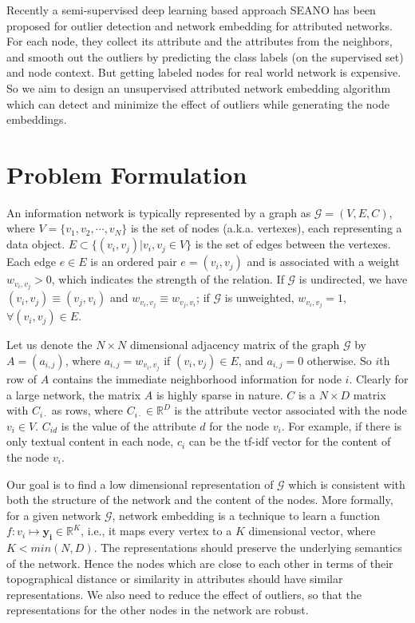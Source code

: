\documentclass[letterpaper]{article} %
\begin{document}
Recently a semi-supervised deep learning based approach SEANO \cite{liang2018semi} has been proposed for outlier detection and network embedding for attributed networks. For each node, they collect its attribute and the attributes from the neighbors, and smooth out the outliers by predicting the class labels (on the supervised set) and node context. But getting labeled nodes for real world network is expensive. So we aim to design an unsupervised attributed network embedding algorithm which can detect and minimize the effect of outliers while generating the node embeddings.  

\section{Problem Formulation} \label{sec:prob}
An information network is typically represented by a graph as $\mathcal{G} = (V, E, C)$, where $V=\{v_1, v_2,\cdots, v_N\}$ is the set of nodes (a.k.a. vertexes), each representing a data object. $E \subset \{(v_i,v_j) | v_i,v_j \in V \}$ is the set of edges between the vertexes. 
Each edge $e \in E$ is an ordered pair $e = (v_i, v_j)$ and is associated with a weight $w_{v_i,v_j} > 0$, which indicates the strength of the relation. If $\mathcal{G}$ is undirected, we have $(v_i, v_j) \equiv (v_j, v_i)$ and $w_{v_i,v_j} \equiv w_{v_j,v_i}$; if $\mathcal{G}$ is unweighted, $w_{v_i,v_j} = 1$, $\forall (v_i,v_j) \in E$.

Let us denote the $N \times N$ dimensional adjacency matrix of the graph $\mathcal{G}$ by $A = (a_{i,j})$, where $a_{i,j}=w_{v_i,v_j}$ if $(v_i,v_j) \in E$, and $a_{i,j}=0$ otherwise. So $i$th row of $A$ contains the immediate neighborhood information for node $i$. Clearly for a large network, the matrix $A$ is highly sparse in nature.
$C$ is a $N \times D$ matrix with $C_{i \cdot}$ as rows, where $C_{i \cdot} \in \mathbb{R}^D$ is the attribute vector associated with the node $v_i \in V$. $C_{id}$ is the value of the attribute $d$ for the node $v_i$. For example, if there is only textual content in each node, $c_i$ can be the tf-idf vector for the content of the node $v_i$.


Our goal is to find a low dimensional representation of $\mathcal{G}$ which is consistent with both the structure of the network and the content of the nodes. More formally, for a given network $\mathcal{G}$, network embedding is a technique to learn a function $f : v_i \mapsto \mathbf{y_i} \in \mathbb{R}^K$, i.e., it maps every vertex to a $K$ dimensional vector, where $K < min(N,D)$. The representations should preserve the underlying semantics of the network. Hence the nodes which are close to each other in terms of their topographical distance or similarity in attributes should have similar representations. We also need to reduce the effect of outliers, so that the representations for the other nodes in the network are robust.
\end{document}

